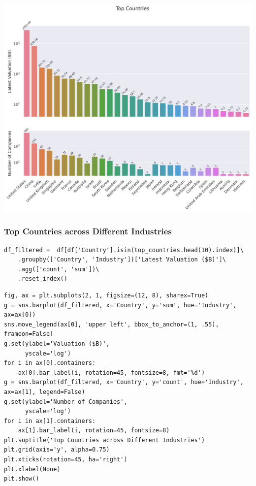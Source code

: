 \documentclass[a4paper,12pt]{article}
\begin{document}
\begin{center}
\includegraphics[width=.9\linewidth]{./.ob-jupyter/5728821c163ecf170189f8e29f22ba792d629424.png}
\label{}
\end{center}
\subsubsection{Top Countries across Different Industries}
\label{sec:orge8c5c84}

\begin{verbatim}
df_filtered =  df[df['Country'].isin(top_countries.head(10).index)]\
    .groupby(['Country', 'Industry'])['Latest Valuation ($B)']\
    .agg(['count', 'sum'])\
    .reset_index()
\end{verbatim}

\begin{verbatim}
fig, ax = plt.subplots(2, 1, figsize=(12, 8), sharex=True)
g = sns.barplot(df_filtered, x='Country', y='sum', hue='Industry', ax=ax[0])
sns.move_legend(ax[0], 'upper left', bbox_to_anchor=(1, .55), frameon=False)
g.set(ylabel='Valuation ($B)',
      yscale='log')
for i in ax[0].containers:
    ax[0].bar_label(i, rotation=45, fontsize=8, fmt='%d')
g = sns.barplot(df_filtered, x='Country', y='count', hue='Industry', ax=ax[1], legend=False)
g.set(ylabel='Number of Companies',
      yscale='log')
for i in ax[1].containers:
    ax[1].bar_label(i, rotation=45, fontsize=8)
plt.suptitle('Top Countries across Different Industries')
plt.grid(axis='y', alpha=0.75)
plt.xticks(rotation=45, ha='right')
plt.xlabel(None)
plt.show()
\end{verbatim}
\end{document}
